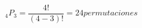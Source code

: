 \documentclass[preview]{standalone}
\begin{document}
\begin{center}
\[{}_4P_3 = \frac{4!}{(4-3)!} = 24 \! permutaciones\]
\end{center}
\end{document}
